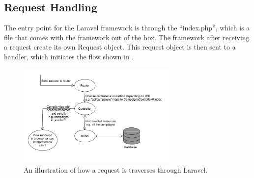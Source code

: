 \subsection{Request Handling}
\label{sub:request_handling}
The entry point for the Laravel framework is through the ``index.php'', which is a file that comes with the framework out of the box. The framework after receiving a request create its own Request object. This request object is then sent to a handler, which initiates the flow shown in .

\begin{figure}[!htbp]
    \centering
    \includegraphics[width=0.7\textwidth]{graphic/architecture/laravel_flow.pdf}
    \caption{An illustration of how a request is traverses through Laravel.}
    \label{fig:laravel_flow}
\end{figure}
\FloatBarrier

